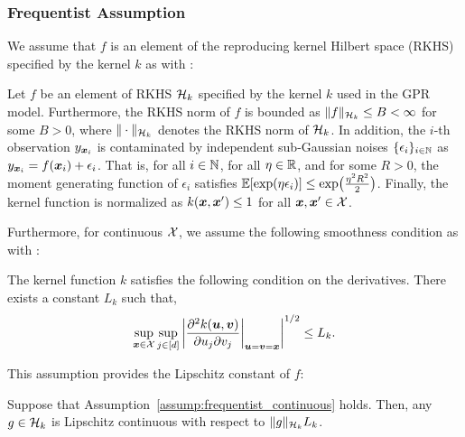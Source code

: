 \subsubsection{Frequentist Assumption}

We assume that $f$ is an element of the reproducing kernel Hilbert space (RKHS) specified by the kernel $k$ as with \citet{Srinivas2010-Gaussian,Chowdhury2017-on,vakili2021-optimal,vakili2022improved,li2022gaussian}:
\begin{assumption}
    Let $f$ be an element of RKHS ${\cal H}_k$ specified by the kernel $k$ used in the GPR model.
    Furthermore, the RKHS norm of $f$ is bounded as $\| f \|_{{\cal H}_k} \leq B < \infty$ for some $B > 0$, where $\| \cdot \|_{{\cal H}_k}$ denotes the RKHS norm of ${\cal H}_k$.
    In addition, the $i$-th observation $y_{\boldsymbol{x}_i}$ is contaminated by independent sub-Gaussian noises $\{ \epsilon_i \}_{i \in \mathbb{N}}$ as $y_{\boldsymbol{x}_i} = f(\boldsymbol{x}_i) + \epsilon_i$.
    That is, for all $i \in \mathbb{N}$, for all $\eta \in \mathbb{R}$, and for some $R > 0$, the moment generating function of $\epsilon_i$ satisfies $\mathbb{E} [\exp (\eta \epsilon_i)] \leq \exp\bigl( \frac{\eta^2 R^2}{2} \bigr) $.
    Finally, the kernel function is normalized as $k(\boldsymbol{x}, \boldsymbol{x}^\prime) \leq 1$ for all $\boldsymbol{x}, \boldsymbol{x}^\prime \in {\cal X}$.
    \label{assump:frequentist}
\end{assumption}


Furthermore, for continuous ${\cal X}$, we assume the following smoothness condition as with \citet{Chowdhury2017-on,vakili2021-optimal,vakili2022improved}:
\begin{assumption}
    The kernel function $k$ satisfies the following condition on the derivatives.
    There exists a constant $L_k$ such that,
    \begin{align*}
        \sup_{\boldsymbol{x} \in {\cal X}} \sup_{j \in [d]} \left| \frac{\partial^2 k(\boldsymbol{u}, \boldsymbol{v})}{\partial u_j \partial v_j}\bigg|_{\boldsymbol{u}=\boldsymbol{v}=\boldsymbol{x}} \right|^{1/2} \leq L_k.
    \end{align*}
    \label{assump:frequentist_continuous}
\end{assumption}
%
This assumption provides the Lipschitz constant of $f$:
\begin{lemma}
    Suppose that Assumption~\ref{assump:frequentist_continuous} holds.
    Then, any $g \in {\cal H}_k$ is Lipschitz continuous with respect to $\|g\|_{{\cal H}_k} L_k$.
    \label{lem:RKHS_lipschitz}
\end{lemma}


